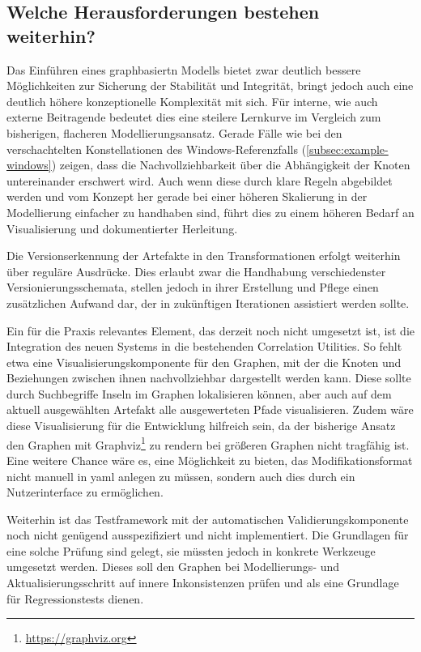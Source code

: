 \subsection{Welche Herausforderungen bestehen weiterhin?}\label{subsec:discussion-negative}

Das Einführen eines graphbasiertn Modells bietet zwar deutlich bessere Möglichkeiten zur Sicherung der Stabilität und Integrität, bringt jedoch auch eine deutlich höhere konzeptionelle Komplexität mit sich.
Für interne, wie auch externe Beitragende bedeutet dies eine steilere Lernkurve im Vergleich zum bisherigen, flacheren Modellierungsansatz.
Gerade Fälle wie bei den verschachtelten Konstellationen des Windows-Referenzfalls (\autoref{subsec:example-windows}) zeigen, dass die Nachvollziehbarkeit über die Abhängigkeit der Knoten untereinander erschwert wird.
Auch wenn diese durch klare Regeln abgebildet werden und vom Konzept her gerade bei einer höheren Skalierung in der Modellierung einfacher zu handhaben sind, führt dies zu einem höheren Bedarf an Visualisierung und dokumentierter Herleitung.

Die Versionserkennung der Artefakte in den Transformationen erfolgt weiterhin über reguläre Ausdrücke.
Dies erlaubt zwar die Handhabung verschiedenster Versionierungsschemata, stellen jedoch in ihrer Erstellung und Pflege einen zusätzlichen Aufwand dar, der in zukünftigen Iterationen assistiert werden sollte.

Ein für die Praxis relevantes Element, das derzeit noch nicht umgesetzt ist, ist die Integration des neuen Systems in die bestehenden Correlation Utilities.
So fehlt etwa eine Visualisierungskomponente für den Graphen, mit der die Knoten und Beziehungen zwischen ihnen nachvollziehbar dargestellt werden kann.
Diese sollte durch Suchbegriffe Inseln im Graphen lokalisieren können, aber auch auf dem aktuell ausgewählten Artefakt alle ausgewerteten Pfade visualisieren.
Zudem wäre diese Visualisierung für die Entwicklung hilfreich sein, da der bisherige Ansatz den Graphen mit Graphviz\footnote{\url{https://graphviz.org}} zu rendern bei größeren Graphen nicht tragfähig ist.
Eine weitere Chance wäre es, eine Möglichkeit zu bieten, das Modifikationsformat nicht manuell in \acrshort{yaml} anlegen zu müssen, sondern auch dies durch ein Nutzerinterface zu ermöglichen.

Weiterhin ist das Testframework mit der automatischen Validierungskomponente noch nicht genügend ausspezifiziert und nicht implementiert.
Die Grundlagen für eine solche Prüfung sind gelegt, sie müssten jedoch in konkrete Werkzeuge umgesetzt werden.
Dieses soll den Graphen bei Modellierungs- und Aktualisierungsschritt auf innere Inkonsistenzen prüfen und als eine Grundlage für Regressionstests dienen.

